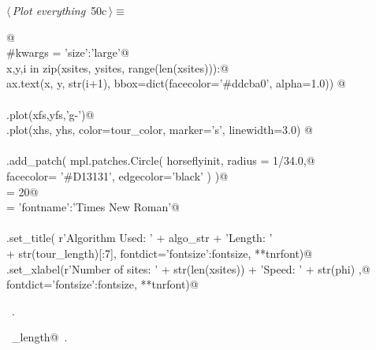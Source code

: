 \documentclass[11.5pt]{report}
\begin{document}
\vspace{-0.8cm} \newchunk
\begin{flushleft} \small
\begin{minipage}{\linewidth}\label{scrap80}\raggedright\small
{} $\langle\,${\itshape Plot everything}\nobreak\ {\footnotesize {50c}}$\,\rangle\equiv$
\vspace{-1ex}
\begin{list}{}{} \item
\mbox{}\verb@ @\\
\mbox{}\verb@#kwargs = {'size':'large'}@\\
\mbox{}\verb@for x,y,i in zip(xsites, ysites, range(len(xsites))):@\\
\mbox{}\verb@    ax.text(x, y, str(i+1), bbox=dict(facecolor='#ddcba0', alpha=1.0)) @\\
\mbox{}\verb@@\\
\mbox{}\verb@ax.plot(xfs,yfs,'g-')@\\
\mbox{}\verb@ax.plot(xhs, yhs, color=tour_color, marker='s', linewidth=3.0) @\\
\mbox{}\verb@@\\
\mbox{}\verb@ax.add_patch( mpl.patches.Circle( horseflyinit, radius = 1/34.0,@\\
\mbox{}\verb@                                  facecolor= '#D13131', edgecolor='black'   )  )@\\
\mbox{}\verb@fontsize = 20@\\
\mbox{}\verb@tnrfont = {'fontname':'Times New Roman'}@\\
\mbox{}\verb@@\\
\mbox{}\verb@ax.set_title( r'Algorithm Used: ' + algo_str +  '\nTour Length: ' \@\\
\mbox{}\verb@               + str(tour_length)[:7], fontdict={'fontsize':fontsize}, **tnrfont)@\\
\mbox{}\verb@ax.set_xlabel(r'Number of sites: ' + str(len(xsites)) + '\nDrone Speed: ' + str(phi) ,@\\
\mbox{}\verb@                  fontdict={'fontsize':fontsize}, **tnrfont)@\\
\mbox{}\verb@@{\NWsep}
\end{list}
\vspace{-1.5ex}
\footnotesize
\begin{list}{}{\setlength{\itemsep}{-\parsep}\setlength{\itemindent}{-\leftmargin}}
\item \NWtxtMacroRefIn\ .
\item \NWtxtIdentsUsed\nobreak\  \verb@tour_length@\nobreak\ .
\item{}
\end{list}
\end{minipage}\vspace{4ex}
\end{flushleft}
\end{document}
